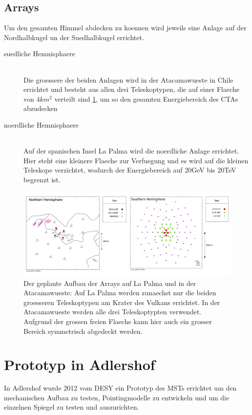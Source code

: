\subsection{Arrays}
Um den gesamten Himmel abdecken zu koennen wird jeweils eine Anlage auf der Nordhalbkugel un der Suedhalbkugel errichtet.
\begin{description}
\item[suedliche Hemnisphaere]\hfill \\
Die groessere der beiden Anlagen wird in der Atacamawueste in Chile errichtet und besteht aus allen drei Teleskoptypen, die auf einer Flaeche von $4km^2$ verteilt sind \ref{img:ArrayLayout}, um so den gesamten Energiebereich des CTAs abzudecken
\item[noerdliche Hemnisphaere]\hfill \\ 
Auf der spanischen Insel La Palma wird die noerdliche Anlage errichtet. Hier steht eine kleinere Flaeche zur Verfuegung und es wird auf die kleinen Teleskope verzichtet, wodurch der Energiebereich auf 20GeV bis 20TeV begrenzt ist.
\end{description}

\begin{figure}[htbp]
\centering
\includegraphics[width=\textwidth]{Images/ArrayLayout.png}
\caption{Der geplante Aufbau der Arrays auf La Palma und in der Atacamawueste: Auf La Palma werden zunaechst nur die beiden groesseren Teleskoptypen am Krater des Vulkans errichtet. In der Atacamawueste werden alle drei Teleskoptypten verwendet. Aufgrund der grossen freien Flaeche kann hier auch ein grosser Bereich symmetrisch abgedeckt werden.}
\label{img:ArrayLayout}
\end{figure}

\section{Prototyp in Adlershof}
In Adlershof wurde 2012 vom DESY ein Prototyp des MSTs errichtet um den mechanischen Aufbau zu testen, Pointingmodelle zu entwickeln und um die einzelnen Spiegel zu testen und auszurichten.

